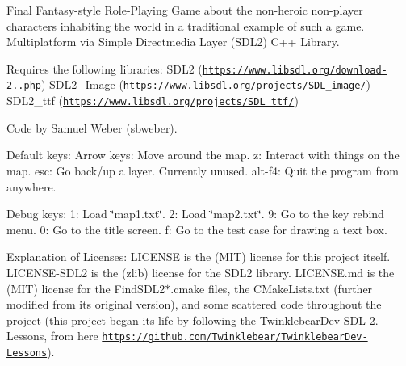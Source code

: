 Final Fantasy-\/style Role-\/\+Playing Game about the non-\/heroic non-\/player characters inhabiting the world in a traditional example of such a game. Multiplatform via Simple Directmedia Layer (S\+D\+L2) C++ Library.

Requires the following libraries\+: S\+D\+L2 (\href{https://www.libsdl.org/download-2.0.php}{\tt https\+://www.\+libsdl.\+org/download-\/2..\+php}) S\+D\+L2\+\_\+\+Image (\href{https://www.libsdl.org/projects/SDL_image/}{\tt https\+://www.\+libsdl.\+org/projects/\+S\+D\+L\+\_\+image/}) S\+D\+L2\+\_\+ttf (\href{https://www.libsdl.org/projects/SDL_ttf/}{\tt https\+://www.\+libsdl.\+org/projects/\+S\+D\+L\+\_\+ttf/})

Code by Samuel Weber (sbweber).

Default keys\+: Arrow keys\+: Move around the map. z\+: Interact with things on the map. esc\+: Go back/up a layer. Currently unused. alt-\/f4\+: Quit the program from anywhere.

Debug keys\+: 1\+: Load \char`\"{}map1.\+txt\char`\"{}. 2\+: Load \char`\"{}map2.\+txt\char`\"{}. 9\+: Go to the key rebind menu. 0\+: Go to the title screen. f\+: Go to the test case for drawing a text box.

Explanation of Licenses\+: L\+I\+C\+E\+N\+SE is the (M\+IT) license for this project itself. L\+I\+C\+E\+N\+S\+E-\/\+S\+D\+L2 is the (zlib) license for the S\+D\+L2 library. L\+I\+C\+E\+N\+S\+E.\+md is the (M\+IT) license for the Find\+S\+D\+L2$\ast$.cmake files, the C\+Make\+Lists.\+txt (further modified from its original version), and some scattered code throughout the project (this project began its life by following the Twinklebear\+Dev S\+DL 2. Lessons, from here \href{https://github.com/Twinklebear/TwinklebearDev-Lessons}{\tt https\+://github.\+com/\+Twinklebear/\+Twinklebear\+Dev-\/\+Lessons}). 
